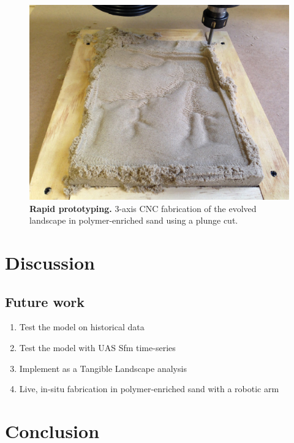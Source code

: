 \documentclass[final,3p,times,twocolumn]{elsarticle}
\begin{document}
\begin{figure}
\centering
\includegraphics[width=\textwidth]{images/cnc_sand.jpg}
\caption{{\bf Rapid prototyping.}
3-axis CNC fabrication of the evolved landscape in polymer-enriched sand using a plunge cut.}
\label{fig:cnc_sand}
\end{figure}

\section{Discussion}

\subsection{Future work}
\begin{enumerate}
\item Test the model on historical data
\item Test the model with UAS Sfm time-series
\item Implement as a Tangible Landscape analysis
\item Live, in-situ fabrication in polymer-enriched sand with a robotic arm
\end{enumerate}

\section{Conclusion}
\end{document}
